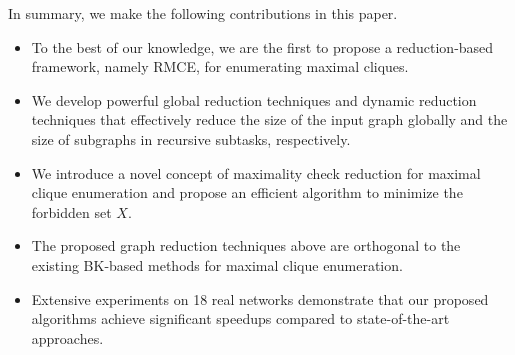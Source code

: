 \documentclass[sigconf, nonacm]{acmart}
\begin{document}

In summary, we make the following contributions in this paper.
\begin{itemize}

\item To the best of our knowledge, we are the first to propose a reduction-based framework, namely RMCE, for enumerating maximal cliques. 

\item We develop powerful global reduction techniques and dynamic reduction techniques that effectively reduce the size of the input graph globally and the size of subgraphs in recursive subtasks, respectively.


\item We introduce a novel concept of maximality check reduction for maximal clique enumeration and propose an efficient algorithm to minimize the forbidden set $X$.

\item The proposed graph reduction techniques above are orthogonal to the existing BK-based methods for maximal clique enumeration. 

\item Extensive experiments on 18 real networks demonstrate that our proposed algorithms achieve significant speedups compared to state-of-the-art approaches.


\end{itemize}


\end{document}
